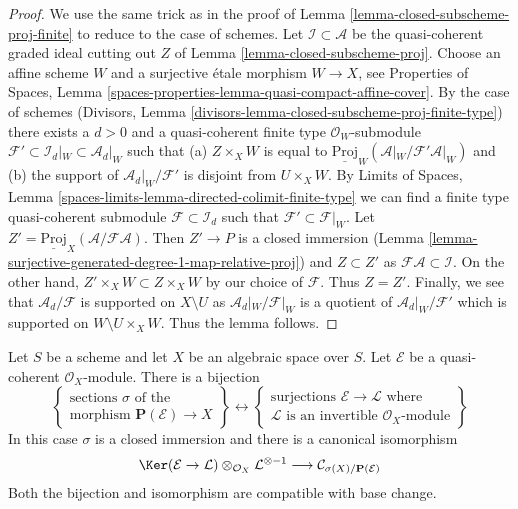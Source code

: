 \begin{proof}
We use the same trick as in the proof of
Lemma \ref{lemma-closed-subscheme-proj-finite}
to reduce to the case of schemes.
Let $\mathcal{I} \subset \mathcal{A}$ be the quasi-coherent graded
ideal cutting out $Z$ of Lemma \ref{lemma-closed-subscheme-proj}.
Choose an affine scheme $W$ and a surjective \'etale morphism
$W \to X$, see Properties of Spaces, Lemma
\ref{spaces-properties-lemma-quasi-compact-affine-cover}.
By the case of schemes
(Divisors, Lemma \ref{divisors-lemma-closed-subscheme-proj-finite-type})
there exists a $d > 0$ and a quasi-coherent finite type
$\mathcal{O}_W$-submodule
$\mathcal{F}' \subset \mathcal{I}_d|_W \subset \mathcal{A}_d|_W$
such that (a) $Z \times_X W$ is equal to
$\underline{\text{Proj}}_W(\mathcal{A}|_W/\mathcal{F}'\mathcal{A}|_W)$
and (b) the support of $\mathcal{A}_d|_W/\mathcal{F}'$ is disjoint from
$U \times_X W$. By Limits of Spaces, Lemma
\ref{spaces-limits-lemma-directed-colimit-finite-type}
we can find a finite type quasi-coherent submodule
$\mathcal{F} \subset \mathcal{I}_d$ such that
$\mathcal{F}' \subset \mathcal{F}|_W$. Let
$Z' = \underline{\text{Proj}}_X(\mathcal{A}/\mathcal{F}\mathcal{A})$.
Then $Z' \to P$ is a closed immersion
(Lemma \ref{lemma-surjective-generated-degree-1-map-relative-proj})
and $Z \subset Z'$ as $\mathcal{F}\mathcal{A} \subset \mathcal{I}$.
On the other hand, $Z' \times_X W \subset Z \times_X W$ by our
choice of $\mathcal{F}$. Thus $Z = Z'$.
Finally, we see that $\mathcal{A}_d/\mathcal{F}$ is supported on
$X \setminus U$ as $\mathcal{A}_d|_W/\mathcal{F}|_W$ is a quotient
of $\mathcal{A}_d|_W/\mathcal{F}'$ which is supported on
$W \setminus U \times_X W$. Thus the lemma follows.
\end{proof}

\begin{lemma}
\label{lemma-conormal-sheaf-section-projective-bundle}
Let $S$ be a scheme and let $X$ be an algebraic space over $S$.
Let $\mathcal{E}$ be a quasi-coherent $\mathcal{O}_X$-module.
There is a bijection
$$
\left\{
\begin{matrix}
\text{sections }\sigma\text{ of the } \\
\text{morphism } \mathbf{P}(\mathcal{E}) \to X
\end{matrix}
\right\}
\leftrightarrow
\left\{
\begin{matrix}
\text{surjections }\mathcal{E} \to \mathcal{L}\text{ where} \\
\mathcal{L}\text{ is an invertible }\mathcal{O}_X\text{-module}
\end{matrix}
\right\}
$$
In this case $\sigma$ is a closed immersion and there is a canonical
isomorphism
$$
\Ker(\mathcal{E} \to \mathcal{L})
\otimes_{\mathcal{O}_X} \mathcal{L}^{\otimes -1}
\longrightarrow
\mathcal{C}_{\sigma(X)/\mathbf{P}(\mathcal{E})}
$$
Both the bijection and isomorphism are compatible with base change.
\end{lemma}

